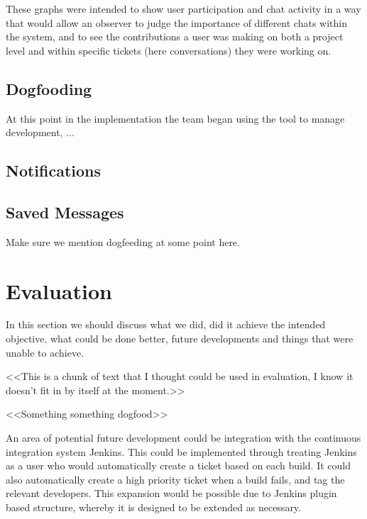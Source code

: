 \documentclass[a4paper]{l3proj}
\begin{document}
These graphs were intended to show user participation and chat activity in a way that would allow an observer to judge the importance of different chats within the system, and to see the contributions a user was making on both a project level and within specific tickets (here conversations) they were working on.

\section{Dogfooding}
\label{dog}
At this point in the implementation the team began using the tool to manage development, ... 


\section{Notifications}
\label{notifications}


\section{Saved Messages}
\label{savedMessages}

Make sure we mention dogfeeding at some point here.

\chapter{Evaluation}
\label{evaluation}

In this section we should discuss what we did, did it achieve the intended objective, what could be done better, 
future developments and things that were unable to achieve.

<<This is a chunk of text that I thought could be used in evaluation, I know it doesn't fit in by itself at the moment.>>

<<Something something dogfood>>

An area of potential future development could be integration with the continuous integration system Jenkins.  This could be implemented through treating Jenkins as a user who would automatically create a ticket based on each build.  It could also automatically create a high priority ticket when a build fails, and tag the relevant developers.  This expansion would be possible due to Jenkins plugin based structure, whereby it is designed to be extended as necessary.
\end{document}

